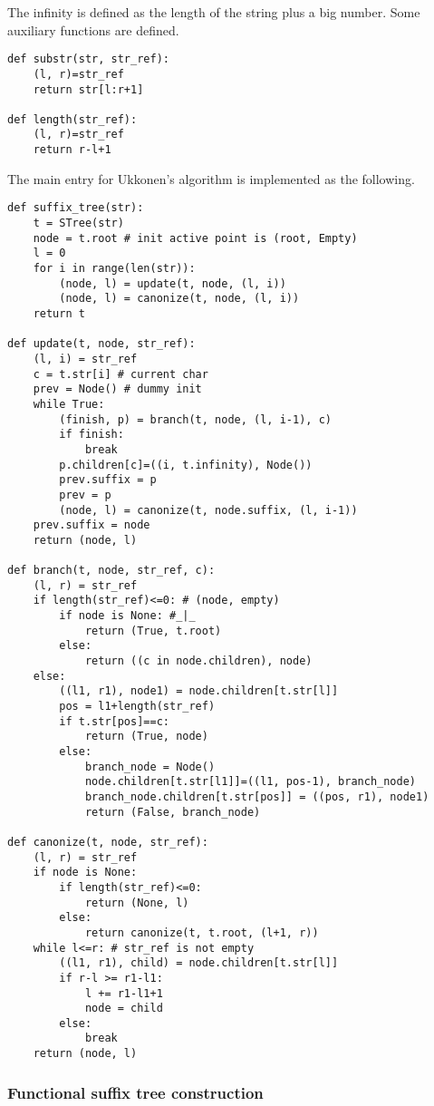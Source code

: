 \documentclass[UTF8]{article}
\begin{document}
The infinity is defined as the length of the string plus a big number.
Some auxiliary functions are defined.

\begin{lstlisting}
def substr(str, str_ref):
    (l, r)=str_ref
    return str[l:r+1]

def length(str_ref):
    (l, r)=str_ref
    return r-l+1
\end{lstlisting}

The main entry for Ukkonen's algorithm is implemented as the following.

\begin{lstlisting}
def suffix_tree(str):
    t = STree(str)
    node = t.root # init active point is (root, Empty)
    l = 0
    for i in range(len(str)):
        (node, l) = update(t, node, (l, i))
        (node, l) = canonize(t, node, (l, i))
    return t

def update(t, node, str_ref):
    (l, i) = str_ref
    c = t.str[i] # current char
    prev = Node() # dummy init
    while True:
        (finish, p) = branch(t, node, (l, i-1), c)
        if finish:
            break
        p.children[c]=((i, t.infinity), Node())
        prev.suffix = p
        prev = p
        (node, l) = canonize(t, node.suffix, (l, i-1))
    prev.suffix = node
    return (node, l)

def branch(t, node, str_ref, c):
    (l, r) = str_ref
    if length(str_ref)<=0: # (node, empty)
        if node is None: #_|_
            return (True, t.root)
        else:
            return ((c in node.children), node)
    else:
        ((l1, r1), node1) = node.children[t.str[l]]
        pos = l1+length(str_ref)
        if t.str[pos]==c:
            return (True, node)
        else:
            branch_node = Node()
            node.children[t.str[l1]]=((l1, pos-1), branch_node)
            branch_node.children[t.str[pos]] = ((pos, r1), node1)
            return (False, branch_node)

def canonize(t, node, str_ref):
    (l, r) = str_ref
    if node is None:
        if length(str_ref)<=0:
            return (None, l)
        else:
            return canonize(t, t.root, (l+1, r))
    while l<=r: # str_ref is not empty
        ((l1, r1), child) = node.children[t.str[l]]
        if r-l >= r1-l1:
            l += r1-l1+1
            node = child
        else:
            break
    return (node, l)
\end{lstlisting}

\subsubsection{Functional suffix tree construction}
\end{document}
